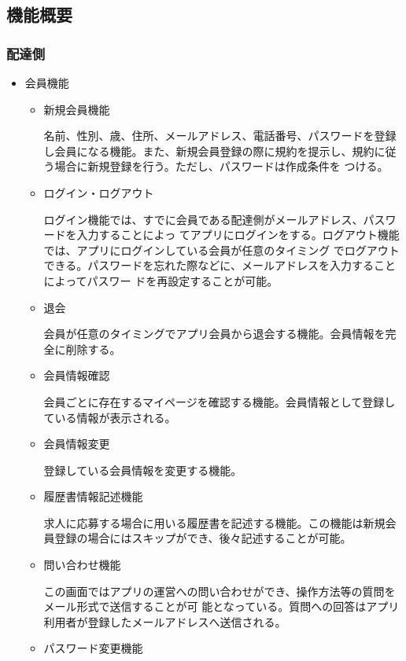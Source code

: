 \subsection{機能概要}

\subsubsection{配達側}

\begin{itemize}
  \item 会員機能
    \begin{itemize}
        \item 新規会員機能
        
        名前、性別、歳、住所、メールアドレス、電話番号、パスワードを登録し会員になる機能。また、新規会員登録の際に規約を提示し、規約に従う場合に新規登録を行う。ただし、パスワードは作成条件を つける。
        \item ログイン・ログアウト
        
        ログイン機能では、すでに会員である配達側がメールアドレス、パスワードを入力することによっ てアプリにログインをする。ログアウト機能では、アプリにログインしている会員が任意のタイミング でログアウトできる。パスワードを忘れた際などに、メールアドレスを入力することによってパスワー ドを再設定することが可能。
        \item 退会
        
        会員が任意のタイミングでアプリ会員から退会する機能。会員情報を完全に削除する。
        \item 会員情報確認
        
        会員ごとに存在するマイページを確認する機能。会員情報として登録している情報が表示される。
        \item 会員情報変更
        
        登録している会員情報を変更する機能。
        \item 履歴書情報記述機能
        
        求人に応募する場合に用いる履歴書を記述する機能。この機能は新規会員登録の場合にはスキップができ、後々記述することが可能。
        \item 問い合わせ機能
        
        この画面ではアプリの運営への問い合わせができ、操作方法等の質問をメール形式で送信することが可 能となっている。質問への回答はアプリ利用者が登録したメールアドレスへ送信される。
        \item パスワード変更機能
      

\end{itemize}
\end{itemize}
